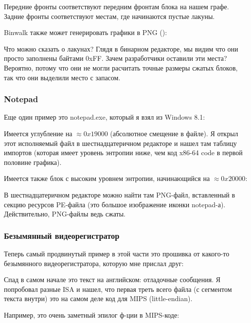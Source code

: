 Передние фронты соответствуют передним фронтам блока на нашем графе.
Задние фронты соответствуют местам, где начинаются пустые лакуны.

Binwalk также может генерировать графики в PNG ():



Что можно сказать о лакунах? Глядя в бинарном редакторе, мы видим что они просто заполнены байтами 0xFF.
Зачем разработчики оставили эти места?
Вероятно, потому что они не могли расчитать точные размеры сжатых блоков, так что они выделили место с запасом.

\subsubsection{Notepad}


Еще один пример это notepad.exe, который я взял из Windows 8.1:



Имеется углубление на $\approx 0x19000$ (абсолютное смещение в файле).
Я открыл этот исполняемый файл в шестнадцатеричном редакторе и нашел там таблицу импортов (которая имеет уровень энтропии
ниже, чем код x86-64 code в первой половине графика).

Имеется также блок с высоким уровнем энтропии, начинающийся на $\approx 0x20000$:



В шестнадцатеричном редакторе можно найти там PNG-файл, вставленный в секцию ресурсов PE-файла (это большое изображение
иконки notepad-а).
Действительно, PNG-файлы ведь сжаты.

\subsubsection{Безымянный видеорегистратор}

Теперь самый продвинутый пример в этой части это прошивка от какого-то безымянного видеорегистратора,
которую мне прислал друг:



Спад в самом начале это текст на английском: отладочные сообщения.
Я попробовал разные \ac{ISA} и нашел, что первая треть всего файла (с сегментом текста внутри) это на самом деле
код для MIPS (little-endian).

Например, это очень заметный эпилог ф-ции в MIPS-коде:

